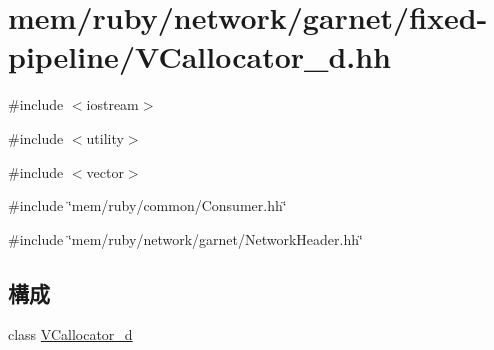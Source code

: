 \hypertarget{VCallocator__d_8hh}{
\section{mem/ruby/network/garnet/fixed-\/pipeline/VCallocator\_\-d.hh}
\label{VCallocator__d_8hh}
}
{\ttfamily \#include $<$iostream$>$}\par
{\ttfamily \#include $<$utility$>$}\par
{\ttfamily \#include $<$vector$>$}\par
{\ttfamily \#include \char`\"{}mem/ruby/common/Consumer.hh\char`\"{}}\par
{\ttfamily \#include \char`\"{}mem/ruby/network/garnet/NetworkHeader.hh\char`\"{}}\par
\subsection*{構成}
\begin{DoxyCompactItemize}
\item 
class \hyperlink{classVCallocator__d}{VCallocator\_\-d}
\end{DoxyCompactItemize}
